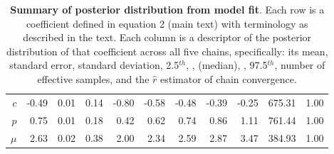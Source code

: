 \documentclass[12pt,english,a4paper]{article}
\begin{document}
\begin{table}[ht]
\begin{tabular}{rrrrrrrrrrr}
  $c$ & -0.49 & 0.01 & 0.14 & -0.80 & -0.58 & -0.48 & -0.39 & -0.25 & 675.31 & 1.00 \\ 
  $p$ & 0.75 & 0.01 & 0.18 & 0.42 & 0.62 & 0.74 & 0.86 & 1.11 & 761.44 & 1.00 \\ 
  $\mu$ & 2.63 & 0.02 & 0.38 & 2.00 & 2.34 & 2.59 & 2.87 & 3.47 & 384.93 & 1.00 \\ 
   \hline
\end{tabular}
\caption{\textbf{Summary of posterior distribution from model fit}. Each row is a coefficient defined in equation 2 (main text) with terminology as described in the text. Each column is a descriptor of the posterior distribution of that coefficient across all five chains, specifically: its mean, standard error, standard deviation, 2.5$^{th}$, ,  (median), , 97.5$^{th}$, number of effective samples, and the $\hat{r}$ estimator of chain convergence\cite{Gelman1992}.}
\label{tab:posterior_summary}
\end{table}



\clearpage


\end{document}
